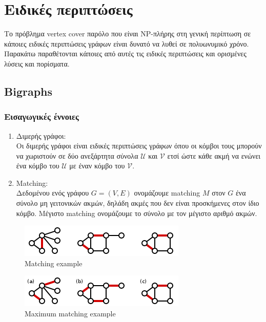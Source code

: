 
\chapter{Ειδικές περιπτώσεις} %

\label{Chapter3} %
Το πρόβλημα vertex cover παρόλο που είναι NP-πλήρης στη γενική περίπτωση σε κάποιες ειδικές περιπτώσεις γράφων είναι δυνατό να λυθεί σε πολυωνυμικό χρόνο. Παρακάτω παραθέτονται κάποιες από αυτές τις ειδικές περιπτώσεις και ορισμένες λύσεις και πορίσματα.

\section{Bigraphs}

\subsection{Εισαγωγικές έννοιες}

\begin{enumerate}
\item
Διμερής γράφοι:\\
Οι διμερής γράφοι είναι ειδικές περιπτώσεις γράφων όπου οι κόμβοι τους μπορούν να χωριστούν σε δύο ανεξάρτητα σύνολα $\mathcal{U}$ και $\mathcal{V}$ ετσί ώστε κάθε ακμή να ενώνει ένα κόμβο του $\mathcal{U}$ με έναν κόμβο του $\mathcal{V}$. 
\item
Matching:\\
Δεδομένου ενός γράφου $G=(V,E)$ ονομάζουμε matching $Μ$ στον $G$ ένα σύνολο μη γειτονικών ακμών, δηλάδη ακμές που δεν είναι προσκήμενες στον ίδιο κόμβο. Μέγιστο matching ονομάζουμε το σύνολο με τον μέγιστο αριθμό ακμών.
\end{enumerate}
\begin{figure}[H]
\caption{Matching example}
\centering
\includegraphics{Figures/match.png}\centering
\end{figure}

\begin{figure}[H]
\caption{Maximum matching example}
\centering
\includegraphics{Figures/max_match.png}\centering
\end{figure}

